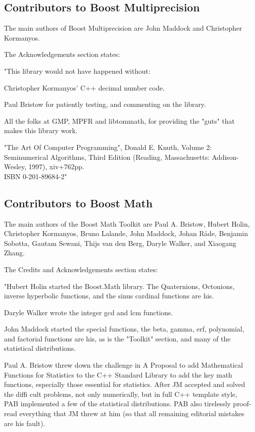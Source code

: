 \subsection{Contributors to Boost Multiprecision}
\label{Contributors to Boost Multiprecision}
The main authors of Boost Multiprecision are John Maddock and Christopher Kormanyos.

\vpara
The Acknowledgements section states:

\vpara
"This library would not have happened without:

Christopher Kormanyos' C++ decimal number code.

Paul Bristow for patiently testing, and commenting on the library.

All the folks at GMP, MPFR and libtommath, for providing the "guts" that makes this library work.

"The Art Of Computer Programming", Donald E. Knuth, Volume 2: Seminumerical Algorithms, Third Edition (Reading, Massachusetts: Addison-Wesley, 1997), xiv+762pp. \\
ISBN 0-201-89684-2"



\subsection{Contributors to Boost Math}
\label{Contributors to Boost Math}
The main authors of the Boost Math Toolkit are Paul A. Bristow, Hubert Holin, Christopher Kormanyos, Bruno Lalande, John Maddock, Johan Råde, Benjamin Sobotta, Gautam
Sewani, Thijs van den Berg, Daryle Walker, and Xiaogang Zhang.

\vpara
The Credits and Acknowledgements section states:

\vpara
"Hubert Holin started the Boost.Math library. The Quaternions, Octonions, inverse hyperbolic functions, and the sinus cardinal functions are his.

\vpara
Daryle Walker wrote the integer gcd and lcm functions.

\vpara
John Maddock started the special functions, the beta, gamma, erf, polynomial, and factorial functions are his, as is the "Toolkit" section, and many of the statistical distributions.

\vpara
Paul A. Bristow threw down the challenge in A Proposal to add Mathematical Functions for Statistics to the C++ Standard Library to add the key math functions, especially those essential for statistics. After JM accepted and solved the diffi cult problems, not only numerically, but in full C++ template style, PAB implemented a few of the statistical distributions. PAB also tirelessly proof-read everything that JM threw at him (so that all remaining editorial mistakes are his fault).

